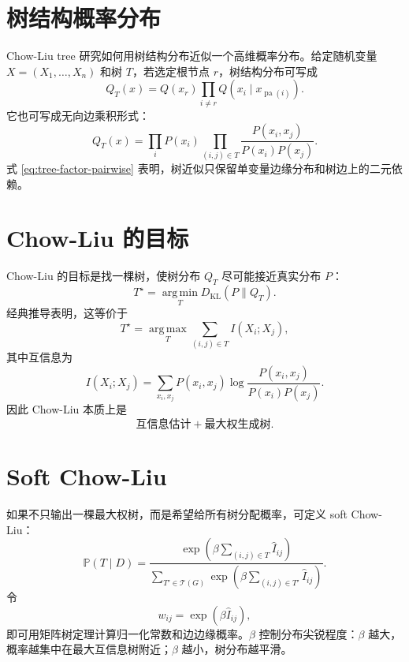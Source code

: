 \documentclass[UTF8,12pt,openany]{ctexrep}
\numberwithin{equation}{chapter}
\theoremstyle{definition}
\theoremstyle{plain}
\newcommand{\Prob}{\mathbb{P}}
\newcommand{\argmin}{\operatorname*{arg\,min}}
\newcommand{\argmax}{\operatorname*{arg\,max}}
\newcommand{\KL}{D_{\mathrm{KL}}}
\newcommand{\pa}{\operatorname{pa}}
\newcommand{\Tcal}{\mathcal{T}}
\begin{document}
\section{树结构概率分布}

Chow-Liu tree 研究如何用树结构分布近似一个高维概率分布。给定随机变量 $X=(X_1,\ldots,X_n)$ 和树 $T$，若选定根节点 $r$，树结构分布可写成
\begin{equation}
Q_T(x)=Q(x_r)\prod_{i\ne r}Q(x_i\mid x_{\pa(i)}).
\label{eq:tree-factor-rooted}
\end{equation}
它也可写成无向边乘积形式：
\begin{equation}
Q_T(x)
=
\prod_i P(x_i)
\prod_{(i,j)\in T}
\frac{P(x_i,x_j)}{P(x_i)P(x_j)}.
\label{eq:tree-factor-pairwise}
\end{equation}
式 \eqref{eq:tree-factor-pairwise} 表明，树近似只保留单变量边缘分布和树边上的二元依赖。

\section{Chow-Liu 的目标}

Chow-Liu 的目标是找一棵树，使树分布 $Q_T$ 尽可能接近真实分布 $P$：
\begin{equation}
T^\star=\argmin_T \KL(P\|Q_T).
\label{eq:chow-liu-kl}
\end{equation}
经典推导表明，这等价于
\begin{equation}
T^\star=\argmax_T \sum_{(i,j)\in T} I(X_i;X_j),
\label{eq:chow-liu-mst}
\end{equation}
其中互信息为
\begin{equation}
I(X_i;X_j)
=
\sum_{x_i,x_j}P(x_i,x_j)
\log\frac{P(x_i,x_j)}{P(x_i)P(x_j)}.
\label{eq:mutual-information}
\end{equation}
因此 Chow-Liu 本质上是
\begin{equation}
\text{互信息估计}+\text{最大权生成树}.
\end{equation}

\section{Soft Chow-Liu}

如果不只输出一棵最大权树，而是希望给所有树分配概率，可定义 soft Chow-Liu：
\begin{equation}
\Prob(T\mid D)
=
\frac{
\exp\left(\beta\sum_{(i,j)\in T}\hat I_{ij}\right)
}{
\sum_{T'\in\Tcal(G)}
\exp\left(\beta\sum_{(i,j)\in T'}\hat I_{ij}\right)
}.
\label{eq:soft-chow-liu}
\end{equation}
令
\begin{equation}
w_{ij}=\exp(\beta \hat I_{ij}),
\end{equation}
即可用矩阵树定理计算归一化常数和边边缘概率。$\beta$ 控制分布尖锐程度：$\beta$ 越大，概率越集中在最大互信息树附近；$\beta$ 越小，树分布越平滑。
\end{document}
